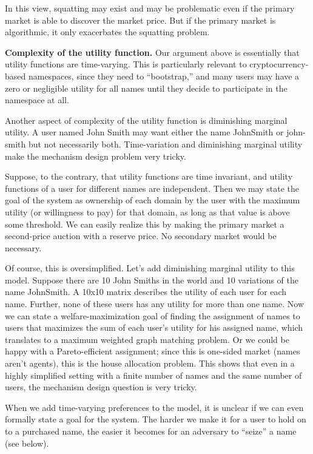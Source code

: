 In this view, squatting may exist and may be problematic even if the primary market is able to discover the market price. But if the primary market is algorithmic, it only exacerbates the squatting problem.


{\bf Complexity of the utility function.} 
Our argument above is essentially that utility functions are time-varying. This is particularly relevant to cryptocurrency-based namespaces, since they need to ``bootstrap,'' \hi{[explain]} and many users may have a zero or negligible utility for all names until they decide to participate in the namespace at all.

Another aspect of complexity of the utility function is diminishing marginal utility. A user named John Smith may want either the name \textsf{JohnSmith} or \textsf{john-smith} but not necessarily both. Time-variation and diminishing marginal utility make the mechanism design problem very tricky.

Suppose, to the contrary, that utility functions are time invariant, and utility functions of a user for different names are independent. Then we may state the goal of the system as ownership of each domain by the user with the maximum utility (or willingness to pay) for that domain, as long as that value is above some threshold. We can easily realize this by making the primary market a second-price auction with a reserve price. No secondary market would be necessary.

Of course, this is oversimplified. Let's add diminishing marginal utility to this model. Suppose there are 10 John Smiths in the world and 10 variations of the name \textsf{JohnSmith}. A 10x10 matrix describes the utility of each user for each name. Further, none of these users has any utility for more than one name. Now we can state a welfare-maximization goal of finding the assignment of names to users that maximizes the sum of each user's utility for his assigned name, which translates to a maximum weighted graph matching problem. Or we could be happy with a Pareto-efficient assignment; since this is one-sided market (names aren't agents), this is the house allocation problem. This shows that even in a highly simplified setting with a finite number of names and the same number of users, the mechanism design question is very tricky.

When we add time-varying preferences to the model, it is unclear if we can even formally state a goal for the system. The harder we make it for a user to hold on to a purchased name, the easier it becomes for an adversary to ``seize'' a name (see below).

